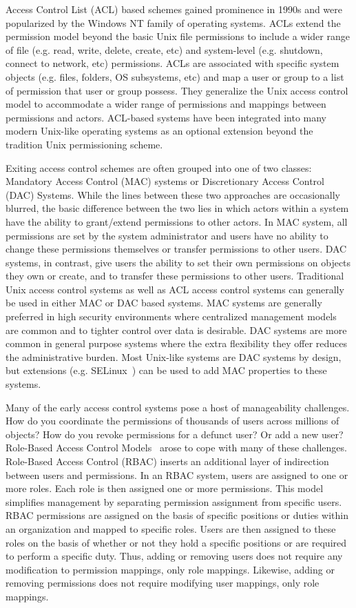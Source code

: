 Access Control List (ACL) based schemes gained prominence in 1990s and
were popularized by the Windows NT family of operating systems. ACLs
extend the permission model beyond the basic Unix file permissions to
include a wider range of file (e.g. read, write, delete, create, etc)
and system-level (e.g. shutdown, connect to network, etc)
permissions. ACLs are associated with specific system objects
(e.g. files, folders, OS subsystems, etc) and map a user or group to a
list of permission that user or group possess. They generalize the
Unix access control model to accommodate a wider range of permissions
and mappings between permissions and actors. ACL-based systems have
been integrated into many modern Unix-like operating systems as an
optional extension beyond the tradition Unix permissioning scheme.

Exiting access control schemes are often grouped into one of two
classes: Mandatory Access Control (MAC) systems or Discretionary
Access Control (DAC) Systems. While the lines between these two
approaches are occasionally blurred, the basic difference between the
two lies in which actors within a system have the ability to
grant/extend permissions to other actors. In MAC system, all
permissions are set by the system administrator and users have no
ability to change these permissions themselves or transfer permissions
to other users. DAC systems, in contrast, give users the ability to
set their own permissions on objects they own or create, and to
transfer these permissions to other users. Traditional Unix access
control systems as well as ACL access control systems can generally be
used in either MAC or DAC based systems. MAC systems are generally
preferred in high security environments where centralized management
models are common and to tighter control over data is desirable. DAC
systems are more common in general purpose systems where the extra
flexibility they offer reduces the administrative burden. Most
Unix-like systems are DAC systems by design, but extensions
(e.g. SELinux~\cite{loscocco2001}) can be used to add MAC properties
to these systems.

Many of the early access control systems pose a host of manageability
challenges. How do you coordinate the permissions of thousands of
users across millions of objects? How do you revoke permissions for a
defunct user? Or add a new user?  Role-Based Access Control
Models~\cite{sandhu1996} arose to cope with many of these challenges.
Role-Based Access Control (RBAC) inserts an additional layer of
indirection between users and permissions. In an RBAC system, users
are assigned to one or more roles. Each role is then assigned one or
more permissions. This model simplifies management by separating
permission assignment from specific users. RBAC permissions are
assigned on the basis of specific positions or duties within an
organization and mapped to specific roles. Users are then assigned to
these roles on the basis of whether or not they hold a specific
positions or are required to perform a specific duty. Thus, adding or
removing users does not require any modification to permission
mappings, only role mappings. Likewise, adding or removing permissions
does not require modifying user mappings, only role mappings.

